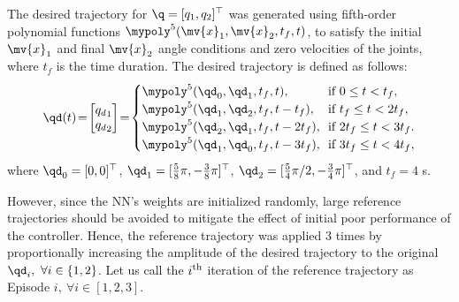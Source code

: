 \documentclass[final,5p,times,twocolumn,authoryear]{elsarticle}
\begin{document}
The desired trajectory for $\q=[q_1,q_2]^\top $ was generated using fifth-order polynomial functions $\mypoly^5(\mv{x}_1,\mv{x}_2,t_f,t)$, to satisfy the initial $\mv{x}_1$ and final $\mv{x}_2$ angle conditions and zero velocities of the joints, where $t_f$ is the time duration.
The desired trajectory is defined as follows:
\begin{equation}
    \qd(t) 
    \!=\! 
    \begin{bmatrix}
        {q_d}_1\\{q_d}_2
    \end{bmatrix}
    \!=\!
    \begin{cases}
    \mypoly^5({\qd}_0,{\qd}_1,t_f,t),
        \!&\!
        \text{if } 0\le t < t_f 
        ,
        \\
    \mypoly^5({\qd}_1,{\qd}_2,t_f,t-t_f),
        \!&\!
        \text{if } t_f\le t < 2t_f 
        ,
        \\
    \mypoly^5({\qd}_2,{\qd}_1,t_f,t-2t_f),
        \!&\! 
        \text{if } 2t_f\le t < 3t_f 
        .
        \\
    \mypoly^5({\qd}_1,{\qd}_0,t_f,t-3t_f),
        \!&\!    
        \text{if } 3t_f\le t < 4t_f 
        ,
        \\
    \end{cases}
    \label{eq:desired trajectory}
\end{equation}
where ${\qd}_0=[0,0]^\top$, ${\qd}_1=[\tfrac{5}{8}\pi,-\tfrac{3}{8}\pi]^\top$, ${\qd}_2=[\tfrac{5}{4}\pi/2,-\tfrac{3}{4}\pi]^\top$, and $t_f=4$ s.

However, since the NN's weights are initialized randomly, large reference trajectories should be avoided to mitigate the effect of initial poor performance of the controller.
Hence, the reference trajectory was applied 3 times by proportionally increasing the amplitude of the desired trajectory to the original ${\qd}_i,\ \forall i\in\{1,2\}$.
Let us call the $i\textsuperscript{th}$ iteration of the reference trajectory as Episode $i,\ \forall i\in[1,2,3]$.
\end{document}
